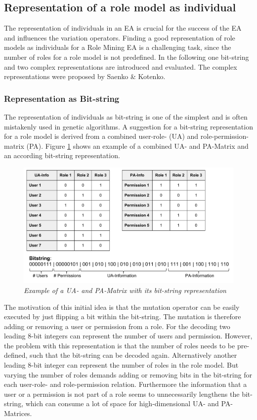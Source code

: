     \subsection{Representation of a role model as individual}
    The representation of individuals in an EA is crucial for the success of the EA and influences the variation operators. Finding a good representation of role models as individuals for a Role Mining EA is a challenging task, since the number of roles for a role model is not predefined. In the following one bit-string and two complex representations are introduced and evaluated. The complex representations were proposed by Saenko \& Kotenko\cite{saenko2012design}.
        \subsubsection{Representation as Bit-string}
        The representation of individuals as bit-string is one of the simplest and is often mistakenly used in genetic algorithms\cite{Eiben}. A suggestion for a bit-string representation for a role model is derived from a combined user-role- (UA) and role-permission-matrix (PA). Figure \ref{fig:representation1} shows an example of a combined UA- and PA-Matrix and an according bit-string representation.
        \begin{figure}
            \centering
            \includegraphics[scale=0.5]{./Figures/BitstringRepresentation}
            \caption{\textit{Example of a UA- and PA-Matrix with its bit-string representation}}
            \label{fig:representation1}
        \end{figure}
        The motivation of this initial idea is that the mutation operator can be easily executed by just flipping a bit within the bit-string. The mutation is therefore adding or removing a user or permission from a role. For the decoding two leading 8-bit integers can represent the number of users and permission. However, the problem with this representation is that the number of roles needs to be pre-defined, such that the bit-string can be decoded again. Alternatively another leading 8-bit integer can represent the number of roles in the role model. But varying the number of roles demands adding or removing bits in the bit-string for each user-role- and role-permission relation. Furthermore the information that a user or a permission is not part of a role seems to unnecessarily lengthens the bit-string, which can consume a lot of space for high-dimensional UA- and PA-Matrices.
